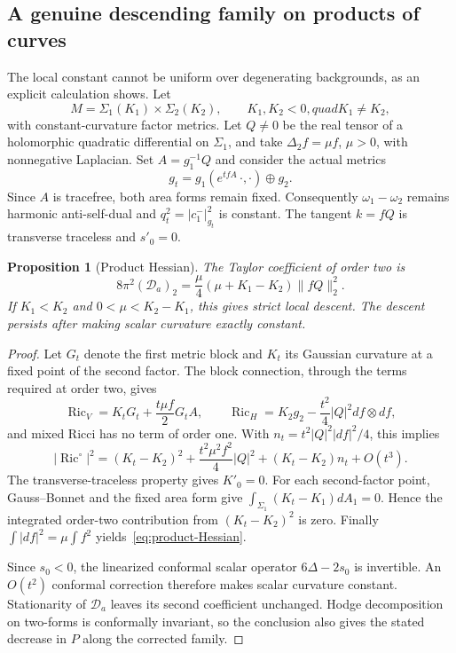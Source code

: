 \documentclass[11pt]{article}
\newcommand{\Ric}{\operatorname{Ric}}
\newtheorem{proposition}[theorem]{Proposition}
\theoremstyle{definition}
\theoremstyle{remark}
\begin{document}
\subsection{A genuine descending family on products of curves}
\label{sec:product}

The local constant cannot be uniform over degenerating backgrounds, as
an explicit calculation shows. Let
\[
 M=\Sigma_1(K_1)\times\Sigma_2(K_2),\qquad K_1,K_2<0,quad K_1\ne K_2,
\]
with constant-curvature factor metrics. Let $Q\ne0$ be the real tensor
of a holomorphic quadratic differential on $\Sigma_1$, and take
$\Delta_2f=\mu f$, $\mu>0$, with nonnegative Laplacian. Set
$A=g_1^{-1}Q$ and consider the actual metrics
\begin{equation}
 g_t=g_1(e^{tfA}\,\cdot,\cdot)\oplus g_2.
 \label{eq:product-family}
\end{equation}
Since $A$ is tracefree, both area forms remain fixed. Consequently
$\omega_1-\omega_2$ remains harmonic anti-self-dual and
$q_t^2=|c_1^-|_{g_t}^2$ is constant. The tangent $k=fQ$ is transverse
traceless and $s'_0=0$.

\begin{proposition}[Product Hessian]
\label{prop:product}
The Taylor coefficient of order two is
\begin{equation}
 \boxed{8\pi^2(\mathscr D_a)_2
      =\frac\mu4(\mu+K_1-K_2)\|fQ\|_2^2.}
 \label{eq:product-Hessian}
\end{equation}
If $K_1<K_2$ and $0<\mu<K_2-K_1$, this gives strict local descent.
The descent persists after making scalar curvature exactly constant.
\end{proposition}
\begin{proof}
Let $G_t$ denote the first metric block and $K_t$ its Gaussian curvature
at a fixed point of the second factor. The block connection, through the
terms required at order two, gives
\[
 \Ric_V=K_tG_t+\frac{t\mu f}{2}G_tA,
 \qquad
 \Ric_H=K_2g_2-\frac{t^2}{4}|Q|^2df\otimes df,
\]
and mixed Ricci has no term of order one. With
$n_t=t^2|Q|^2|df|^2/4$, this implies
\[
 |\Ric^\circ|^2=(K_t-K_2)^2
       +\frac{t^2\mu^2f^2}{4}|Q|^2+(K_t-K_2)n_t+O(t^3).
\]
The transverse-traceless property gives $K'_0=0$. For each second-factor
point, Gauss--Bonnet and the fixed area form give
$\int_{\Sigma_1}(K_t-K_1)dA_1=0$. Hence the integrated order-two
contribution from $(K_t-K_2)^2$ is zero. Finally
$\int|df|^2=\mu\int f^2$ yields~\eqref{eq:product-Hessian}.

Since $s_0<0$, the linearized conformal scalar operator
$6\Delta-2s_0$ is invertible. An $O(t^2)$ conformal correction therefore
makes scalar curvature constant. Stationarity of $\mathscr D_a$ leaves
its second coefficient unchanged. Hodge decomposition on two-forms is
conformally invariant, so the conclusion also gives the stated decrease
in $P$ along the corrected family.
\end{proof}
\end{document}
